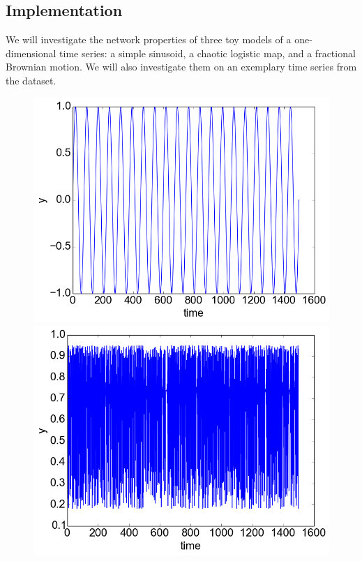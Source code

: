 \documentclass[12pt]{article}
\begin{document}
\subsection{Implementation}

We will investigate the network properties of three toy models of a one-dimensional time series: a simple sinusoid, a chaotic logistic map, and a fractional Brownian motion. We will also investigate them on an exemplary time series from the dataset.

\begin{figure}\label{fig:stack_ts_plots}
  \begin{center}
    \includegraphics[scale=0.6]{plot_sinusoid}
    \includegraphics[scale=0.6]{plot_logistic}

\end{center}
\end{figure}
\end{document}
